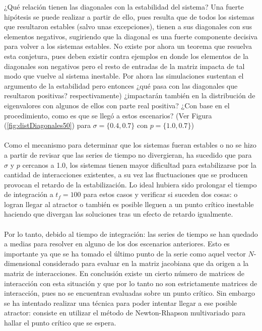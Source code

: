 \documentclass[a4paper,11pt]{book}
\theoremstyle{plain}
\theoremstyle{definition}
\begin{document}
¿Qué relación tienen las diagonales con la estabilidad del sistema? Una fuerte hipótesis se puede realizar a partir de ello, pues resulta que de todos los sistemas que resultaron estables (salvo unas excepciones), tienen a sus diagonales con sus elementos negativos, sugiriendo que la diagonal es una fuerte componente decisiva para volver a los sistemas estables. No existe por ahora un teorema que resuelva esta conjetura, pues deben existir contra ejemplos en donde los elementos de la diagonales son negativos pero el resto de entradas de la matriz impacta de tal modo que vuelve al sistema inestable. Por ahora las simulaciones sustentan el argumento de la estabilidad pero entonces ¿qué pasa con las diagonales que resultaron positivas?  respectivamente) ¿impactarán también en la distribución de eigenvalores con algunos de ellos con parte real positiva? ¿Con base en el procedimiento, como es que se llegó a estos escenarios? (Ver Figura (\ref{fig:distDiagonales50}) para $\sigma=\{0.4,0.7\}$ con $p=\{1.0,0.7\}$)\\
\\
Como el mecanismo para determinar que los sistemas fueran estables o no se hizo a partir de revisar que las series de tiempo no divergieran, ha sucedido que para $\sigma$ y $p$ cercanos a 1.0, los sistemas tienen mayor dificultad para estabilizarse por la cantidad de interacciones existentes, a su vez las fluctuaciones que se producen provocan el retardo  de la estabilización. Lo ideal hubiera sido prolongar el tiempo de integración a $t_f=100$ para estos casos y verificar si suceden dos cosas: o logran llegar al atractor o también es posible lleguen a un punto crítico inestable haciendo que divergan las soluciones tras un efecto de retardo igualmente. \\
\\
Por lo tanto, debido al tiempo de integración: las series de tiempo se han quedado a medias para resolver en alguno de los dos escenarios anteriores. Esto es importante ya que se ha tomado el último punto de la serie como aquel vector $N$-dimensional considerado para evaluar en la matriz jacobiana que da origen a la matriz de interacciones. En conclusión existe un cierto número de matrices de interacción con esta situación y que por lo tanto no son estrictamente matrices de interacción, pues no  se encuentran evaluadas sobre un punto crítico. Sin embargo se ha intentado realizar una técnica para poder intentar llegar a ese posible atractor: consiste en utilizar el método de Newton-Rhapson multivariado para hallar el punto crítico que se espera.\\
\end{document}
